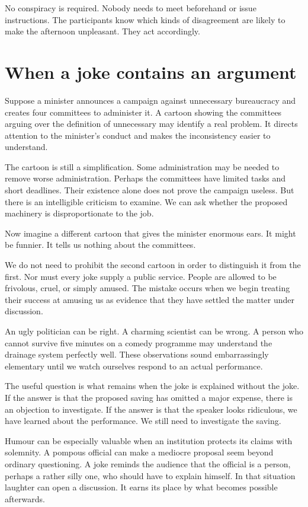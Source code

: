 \documentclass[12pt,a4paper]{book}
\begin{document}
No conspiracy is required. Nobody needs to meet beforehand or issue instructions. The participants know which kinds of disagreement are likely to make the afternoon unpleasant. They act accordingly.

\section*{When a joke contains an argument}

Suppose a minister announces a campaign against unnecessary bureaucracy and creates four committees to administer it. A cartoon showing the committees arguing over the definition of unnecessary may identify a real problem. It directs attention to the minister's conduct and makes the inconsistency easier to understand.

The cartoon is still a simplification. Some administration may be needed to remove worse administration. Perhaps the committees have limited tasks and short deadlines. Their existence alone does not prove the campaign useless. But there is an intelligible criticism to examine. We can ask whether the proposed machinery is disproportionate to the job.

Now imagine a different cartoon that gives the minister enormous ears. It might be funnier. It tells us nothing about the committees.

We do not need to prohibit the second cartoon in order to distinguish it from the first. Nor must every joke supply a public service. People are allowed to be frivolous, cruel, or simply amused. The mistake occurs when we begin treating their success at amusing us as evidence that they have settled the matter under discussion.

An ugly politician can be right. A charming scientist can be wrong. A person who cannot survive five minutes on a comedy programme may understand the drainage system perfectly well. These observations sound embarrassingly elementary until we watch ourselves respond to an actual performance.

The useful question is what remains when the joke is explained without the joke. If the answer is that the proposed saving has omitted a major expense, there is an objection to investigate. If the answer is that the speaker looks ridiculous, we have learned about the performance. We still need to investigate the saving.

Humour can be especially valuable when an institution protects its claims with solemnity. A pompous official can make a mediocre proposal seem beyond ordinary questioning. A joke reminds the audience that the official is a person, perhaps a rather silly one, who should have to explain himself. In that situation laughter can open a discussion. It earns its place by what becomes possible afterwards.
\end{document}
